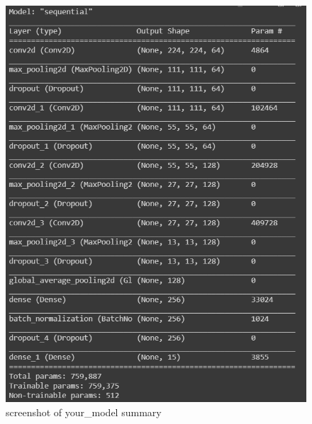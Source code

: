 \begin{figure}[htbp]
    \centering
    \includegraphics[scale=0.8]{your_model.png}
    \caption{screenshot of your\_model summary}
    \label{fig:your_model_summary}
\end{figure}

